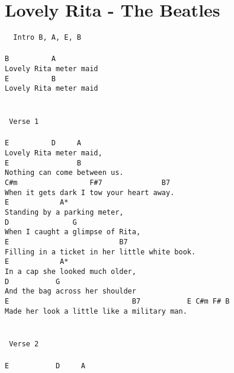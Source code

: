 \newpage
\section{Lovely Rita - The Beatles}
\label{Lovely Rita - The Beatles}
\texttt{
\lbrack\ Intro\rbrack\ B,\ A,\ E,\ B\\
\\
B\ \ \ \ \ \ \ \ \ \ A\\
Lovely\ Rita\ meter\ maid\\
E\ \ \ \ \ \ \ \ \ \ B\\
Lovely\ Rita\ meter\ maid\\
\\
\\
\lbrack\ Verse\ 1\rbrack\\
\\
E\ \ \ \ \ \ \ \ \ \ D\ \ \ \ \ A\\
Lovely\ Rita\ meter\ maid,\\
E\ \ \ \ \ \ \ \ \ \ \ \ \ \ \ \ B\\
Nothing\ can\ come\ between\ us.\\
C\#m\ \ \ \ \ \ \ \ \ \ \ \ \ \ \ \ \ F\#7\ \ \ \ \ \ \ \ \ \ \ \ \ \ B7\\
When\ it\ gets\ dark\ I\ tow\ your\ heart\ away.\\
E\ \ \ \ \ \ \ \ \ \ \ \ A*\\
Standing\ by\ a\ parking\ meter,\\
D\ \ \ \ \ \ \ \ \ \ \ \ \ \ \ G\\
When\ I\ caught\ a\ glimpse\ of\ Rita,\\
E\ \ \ \ \ \ \ \ \ \ \ \ \ \ \ \ \ \ \ \ \ \ \ \ \ \ B7\\
Filling\ in\ a\ ticket\ in\ her\ little\ white\ book.\\
E\ \ \ \ \ \ \ \ \ \ \ \ A*\\
In\ a\ cap\ she\ looked\ much\ older,\\
D\ \ \ \ \ \ \ \ \ \ \ G\\
And\ the\ bag\ across\ her\ shoulder\\
E\ \ \ \ \ \ \ \ \ \ \ \ \ \ \ \ \ \ \ \ \ \ \ \ \ \ \ \ \ B7\ \ \ \ \ \ \ \ \ \ \ E\ C\#m\ F\#\ B\\
Made\ her\ look\ a\ little\ like\ a\ military\ man.\\
\\
\\
\lbrack\ Verse\ 2\rbrack\\
\\
E\ \ \ \ \ \ \ \ \ \ \ D\ \ \ \ \ A\\
}
